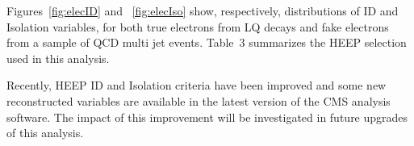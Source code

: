Figures~\ref{fig:elecID} and ~\ref{fig:elecIso} show, respectively, distributions of ID and Isolation variables, 
for both true electrons from LQ decays and fake electrons from a sample of QCD multi jet events. 
Table~3 
summarizes the HEEP selection used in this analysis. 

Recently, HEEP ID and Isolation criteria have been improved
and some new reconstructed variables are available in the latest version 
of the CMS analysis software. 
The impact of this improvement will be investigated in 
future upgrades of this analysis. 






